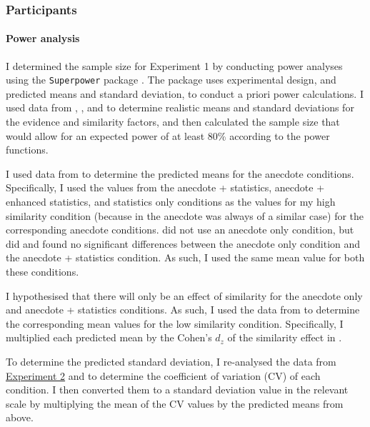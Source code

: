\documentclass[a4paper, nobind, dvipsnames]{templates/ociamthesis}
\theoremstyle{definition}
\theoremstyle{definition}
\theoremstyle{definition}
\theoremstyle{definition}
\theoremstyle{remark}
\begin{document}
\hypertarget{participants-15}{%
\subsubsection{Participants}\label{participants-15}}

\hypertarget{power-analysis-anecdotes-1}{%
\paragraph{Power analysis}\label{power-analysis-anecdotes-1}}

I determined the sample size for Experiment 1 by conducting power analyses using
the \texttt{Superpower} package \autocite{lakens2019}. The package uses experimental design,
and predicted means and standard deviation, to conduct a priori power
calculations. I used data from \textcite{wainberg2018}, \textcite{jaramillo2019}, and \textcite[Study 3]{hoeken2009} to determine realistic means and standard deviations for the evidence
and similarity factors, and then calculated the sample size that would allow for
an expected power of at least 80\% according to the power functions.

I used data from \textcite{wainberg2018} to determine the predicted means for the anecdote
conditions. Specifically, I used the values from the anecdote + statistics,
anecdote + enhanced statistics, and statistics only conditions as the values for
my high similarity condition (because in \textcite{wainberg2018} the anecdote was always
of a similar case) for the corresponding anecdote conditions. \textcite{wainberg2018} did
not use an anecdote only condition, but \textcite{wainberg2013} did and found no
significant differences between the anecdote only condition and the anecdote +
statistics condition. As such, I used the same mean value for both these
conditions.

I hypothesised that there will only be an effect of similarity for the anecdote
only and anecdote + statistics conditions. As such, I used the data from
\textcite[Study 3]{hoeken2009} to determine the corresponding mean values for the low
similarity condition. Specifically, I multiplied each predicted mean by the
Cohen's \(d_z\) of the similarity effect in \textcite[Study 3]{hoeken2009}.

To determine the predicted standard deviation, I re-analysed the data from
\textcite{jaramillo2019} \protect\hyperlink{anecdotes-2-appendix}{Experiment 2} and \textcite[Study 3]{hoeken2009} to determine the
coefficient of variation (CV) of each condition. I then converted them to a
standard deviation value in the relevant scale by multiplying the mean of the CV
values by the predicted means from above.
\end{document}
